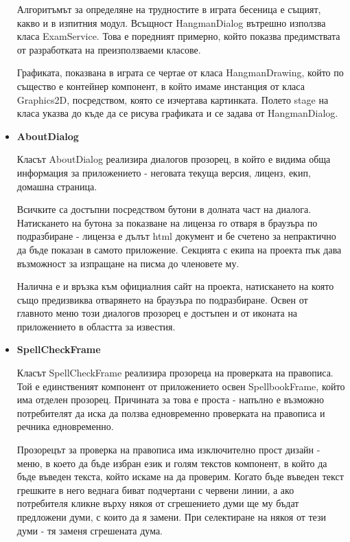 \begin{itemize}
      Алгоритъмът за определяне на трудностите в играта бесеница е
      същият, какво и в изпитния модул. Всъщност HangmanDialog
      вътрешно използва класа ExamService. Това е поредният примерно,
      който показва предимствата от разработката на преизползваеми
      класове.

      Графиката, показвана в играта се чертае от класа HangmanDrawing,
      който по същество е контейнер компонент, в който имаме инстанция
      от класа Graphics2D, посредством, която се изчертава
      картинката. Полето stage на класа указва до къде да се рисува
      графиката и се задава от HangmanDialog. 

    \item \textbf{AboutDialog}

      Класът AboutDialog реализира диалогов прозорец, в който е видима
      обща информация за приложението - неговата текуща версия,
      лиценз, екип, домашна страница.

      Всичките са достъпни посредством бутони в долната част на
      диалога. Натискането на бутона за показване на лиценза го отваря
      в браузъра по подразбиране - лиценза е дълът html документ и бе
      счетено за непрактично да бъде показан в самото
      приложение. Секцията с екипа на проекта пък дава възможност за
      изпращане на писма до членовете му.

      Налична е и връзка към официалния сайт на проекта, натискането
      на която също предизвиква отварянето на браузъра по
      подразбиране. Освен от главното меню този диалогов прозорец е
      достъпен и от иконата на приложението в областта за известия.

   \item \textbf{SpellCheckFrame}

     Класът SpellCheckFrame реализира прозореца на проверката на
     правописа. Той е единственият компонент от приложението освен
     SpellbookFrame, който има отделен прозорец. Причината за това е
     проста - напълно е възможно потребителят да иска да ползва
     едновременно проверката на правописа и речника едновременно. 

     Прозорецът за проверка на правописа има изключително прост дизайн
     - меню, в което да бъде избран език и голям текстов компонент, в
     който да бъде въведен текста, който искаме на да проверим. Когато
     бъде въведен текст грешките в него веднага биват подчертани с
     червени линии, а ако потребителя кликне върху някоя от
     сгрешението думи ще му бъдат предложени думи, с които да я
     замени. При селектиране на някоя от тези думи - тя заменя
     сгрешената дума. 


\end{itemize}

